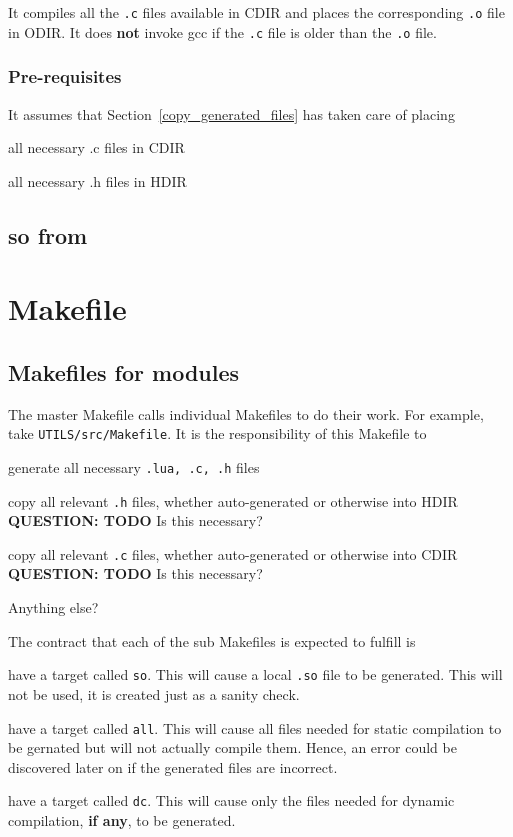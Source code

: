 It compiles all the {\tt .c} files available in CDIR and places 
the corresponding {\tt .o} file in ODIR. It does {\bf not} invoke gcc if the {\tt.c}
file is older than the {\tt .o} file. 


\subsubsection{Pre-requisites}
It assumes that Section~\ref{copy_generated_files} has taken care of placing
\be
\item all necessary .c files in CDIR
\item all necessary .h files in HDIR
\ee

\subsection{so from}
\label{so_from_o}
\TBC

\section{Makefile}

\subsection{Makefiles for modules}
The master Makefile calls individual Makefiles to do their work. For example,
take \verb+UTILS/src/Makefile+. It is the responsibility of this Makefile to
\be
\item generate all necessary {\tt .lua, .c, .h} files
\item copy all relevant \verb+.h+ files, whether auto-generated or otherwise
into HDIR  {\bf QUESTION: TODO } Is this necessary?
\item copy all relevant \verb+.c+ files, whether auto-generated or otherwise
into CDIR  {\bf QUESTION: TODO } Is this necessary?
\item Anything else? \TBC
\ee

The contract that each of the sub Makefiles is expected to fulfill is
\be
\item 
have a target called {\tt so}. This will cause a local \verb+.so+ file 
to be generated. This will not be used, it is created just as a 
sanity check.
\item have a target called {\tt all}. This will cause all files needed for
static compilation to be gernated but will not actually compile them. Hence, an
error could be discovered later on if the generated files are incorrect.
\item have a target called {\tt dc}. This will cause only the files needed for
dynamic compilation, {\bf if any}, to be generated.

